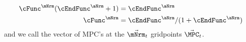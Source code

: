 \documentclass[\econtexRoot/BufferStockTheory]{subfiles}
\begin{document}
\begin{align*}
   \cFunc^{\mNrm}(\cEndFunc^{\aNrm}+1)  & = \cEndFunc^{\aNrm}
\\ \cFunc^{\mNrm}  & = \cEndFunc^{\aNrm}/(1+\cEndFunc^{\aNrm}) \label{eq:MPCfromMPTHC}
\end{align*}
and we call the vector of MPC's at the $\vec{\mNrm}_{t}$ gridpoints $\vec{\MPC}_{t}$.

\end{document}
